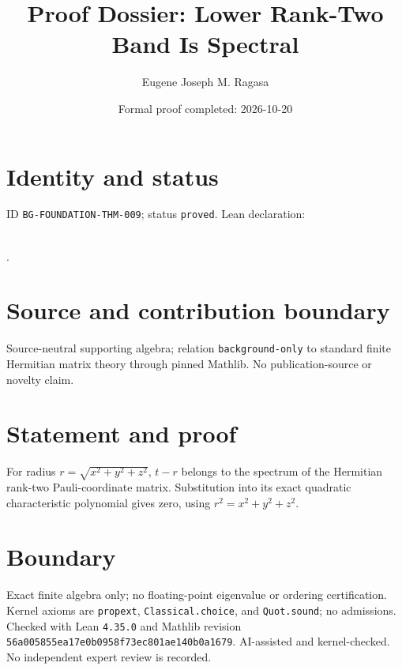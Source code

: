 \documentclass[11pt]{article}
\title{Proof Dossier: Lower Rank-Two Band Is Spectral}\author{Eugene Joseph M. Ragasa}\date{Formal proof completed: 2026-10-20}
\begin{document}
\maketitle
\section{Identity and status}
ID \texttt{BG-FOUNDATION-THM-009}; status \texttt{proved}. Lean declaration:
\par{}\\
{\tiny{}}.
\section{Source and contribution boundary}
Source-neutral supporting algebra; relation \texttt{background-only} to standard finite
Hermitian matrix theory through pinned Mathlib. No publication-source or novelty claim.
\section{Statement and proof}
For radius $r=\sqrt{x^2+y^2+z^2}$, $t-r$ belongs to the spectrum of the Hermitian
rank-two Pauli-coordinate matrix. Substitution into its exact quadratic characteristic
polynomial gives zero, using $r^2=x^2+y^2+z^2$.
\section{Boundary}
Exact finite algebra only; no floating-point eigenvalue or ordering certification.
Kernel axioms are \texttt{propext}, \texttt{Classical.choice}, and \texttt{Quot.sound}; no admissions. Checked with Lean \texttt{4.35.0} and Mathlib revision \texttt{56a005855ea17e0b0958f73ec801ae140b0a1679}. AI-assisted and kernel-checked. No independent expert review is recorded.
\end{document}
